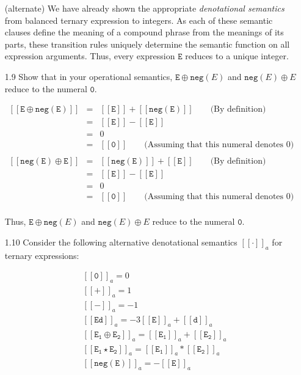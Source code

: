 \documentclass[a4paper,10pt]{article}
\newcommand{\E}{\mathtt{E}}
\newcommand{\digit}{\mathtt{d}}
\newcommand{\negation}{\mathtt{neg}}
\newcommand{\denot}[1]{\mathtt{[[{#1}]]}}
\newcommand{\question}[1]
{\color{DarkBlue}#1 \color{Black} \newline}
\begin{document}
\begin{enumerate}
\proof (alternate)
We have already shown the appropriate \textit{denotational
semantics} from balanced ternary expression to integers. 
As each of these semantic clauses define the meaning of a compound
phrase from the meanings of its parts, these transition rules uniquely 
determine the semantic function on all expression arguments.
Thus, every expression $\E$ reduces to a unique integer.

\question{
\item[1.9] Show that in your operational semantics, $\E \oplus \negation(E)$ and 
$\negation(E) \oplus E$ reduce to the numeral $\mathtt{0}$.
}

\begin{eqnarray*}
\denot{E \oplus \negation(E)}
	& = & \denot{E} + \denot{\negation(E)} \qquad \text{(By definition)} \\
	& = & \denot{E} - \denot{E} \\
	& = & 0	\\
	& = & \denot{\mathtt{0}} \qquad \text{(Assuming that this numeral denotes 0)}\\
\end{eqnarray*}
\begin{eqnarray*}
\denot{\negation(E) \oplus E} 
	& = & \denot{\negation(E)} + \denot{E}  \qquad \text{(By definition)} \\
	& = & \denot{E} - \denot{E} \\
	& = & 0	\\
	& = & \denot{\mathtt{0}}	\qquad \text{(Assuming that this numeral denotes 0)}\\
\end{eqnarray*}

Thus, $\E \oplus \negation(E)$ and $\negation(E) \oplus E$ reduce to the 
numeral $\mathtt{0}$.

\question{
\item[1.10] Consider the following alternative denotational semantics $\denot{\cdot}_a$ for ternary expressions:

\begin{align*}
& \denot{\mathtt{0}}_a = 0 \\ & \denot{\mathtt{+}}_a = 1 \\ & \denot{\mathtt{-}}_a = -1 \\
& \denot{\E \digit}_a = -3\denot{E}_a + \denot{\digit}_a \\
& \denot{\E_1 \oplus \E_2}_a = \denot{\E_1}_a + \denot{\E_2}_a \\
& \denot{\E_1 \star \E_2}_a = \denot{\E_1}_a * \denot{\E_2}_a \\
& \denot{\negation(\E)}_a = -\denot{\E}_a
\end{align*}

}
\end{enumerate}
\end{document}

